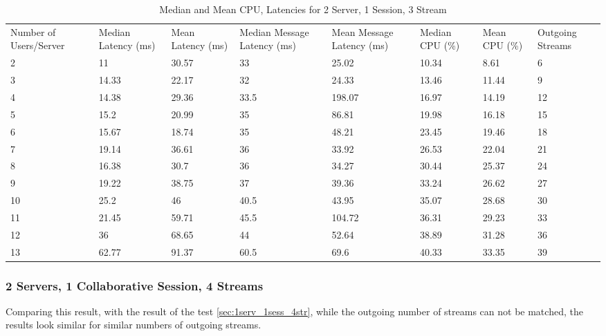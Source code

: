 \begin{table}
\caption{Median and Mean CPU, Latencies for 2 Server, 1 Session, 3 Stream}
\label{table:2serv_1sess_3str}
\begin{tabu} to\linewidth{|X[c]|X[c]|X[c]|X[c]|X[c]|X[c]|X[c]|X[c]|}
\everyrow{\hline}
\hline
Number of Users/Server & Median Latency (ms) & Mean Latency (ms) & Median Message Latency (ms) & Mean Message Latency (ms) & Median CPU (\%) & Mean CPU (\%) & Outgoing Streams\\
2 & 11 & 30.57 & 33 & 25.02 & 10.34 & 8.61 & 6 \\
3 & 14.33 & 22.17 & 32 & 24.33 & 13.46 & 11.44 & 9 \\
4 & 14.38 & 29.36 & 33.5 & 198.07 & 16.97 & 14.19 & 12 \\
5 & 15.2 & 20.99 & 35 & 86.81 & 19.98 & 16.18 & 15 \\
6 & 15.67 & 18.74 & 35 & 48.21 & 23.45 & 19.46 & 18 \\
7 & 19.14 & 36.61 & 36 & 33.92 & 26.53 & 22.04 & 21 \\
8 & 16.38 & 30.7 & 36 & 34.27 & 30.44 & 25.37 & 24 \\
9 & 19.22 & 38.75 & 37 & 39.36 & 33.24 & 26.62 & 27 \\
10 & 25.2 & 46 & 40.5 & 43.95 & 35.07 & 28.68 & 30 \\
11 & 21.45 & 59.71 & 45.5 & 104.72 & 36.31 & 29.23 & 33 \\
12 & 36 & 68.65 & 44 & 52.64 & 38.89 & 31.28 & 36 \\
13 & 62.77 & 91.37 & 60.5 & 69.6 & 40.33 & 33.35 & 39 \\
\end{tabu}
\end{table}

\clearpage\subsubsection{2 Servers, 1 Collaborative Session, 4 Streams}

Comparing this result, with the result of the test \ref{sec:1serv_1sess_4str}, while the outgoing number of streams can not be matched, the results look similar for similar numbers of outgoing streams.

